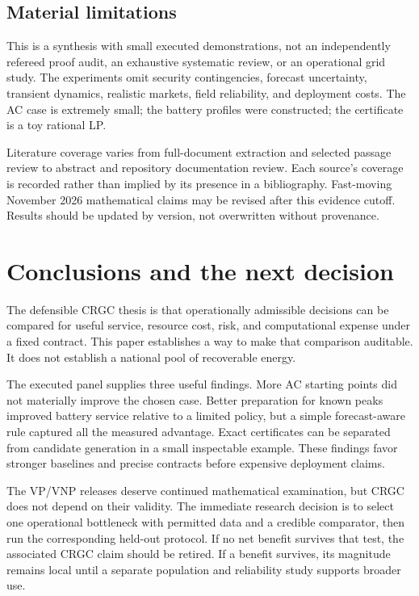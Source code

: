 \documentclass[11pt,letterpaper]{article}
\begin{document}
\subsection{Material limitations}
This is a synthesis with small executed demonstrations, not an independently refereed proof audit, an exhaustive systematic review, or an operational grid study. The experiments omit security contingencies, forecast uncertainty, transient dynamics, realistic markets, field reliability, and deployment costs. The AC case is extremely small; the battery profiles were constructed; the certificate is a toy rational LP.

Literature coverage varies from full-document extraction and selected passage review to abstract and repository documentation review. Each source's coverage is recorded rather than implied by its presence in a bibliography. Fast-moving November 2026 mathematical claims may be revised after this evidence cutoff. Results should be updated by version, not overwritten without provenance.

\section{Conclusions and the next decision}
The defensible CRGC thesis is that operationally admissible decisions can be compared for useful service, resource cost, risk, and computational expense under a fixed contract. This paper establishes a way to make that comparison auditable. It does not establish a national pool of recoverable energy.

The executed panel supplies three useful findings. More AC starting points did not materially improve the chosen case. Better preparation for known peaks improved battery service relative to a limited policy, but a simple forecast-aware rule captured all the measured advantage. Exact certificates can be separated from candidate generation in a small inspectable example. These findings favor stronger baselines and precise contracts before expensive deployment claims.

The VP/VNP releases deserve continued mathematical examination, but CRGC does not depend on their validity. The immediate research decision is to select one operational bottleneck with permitted data and a credible comparator, then run the corresponding held-out protocol. If no net benefit survives that test, the associated CRGC claim should be retired. If a benefit survives, its magnitude remains local until a separate population and reliability study supports broader use.
\end{document}
